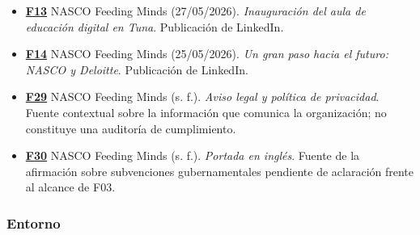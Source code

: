 \documentclass[
]{article}
\begin{document}
\begin{itemize}
  \textbf{\href{https://www.linkedin.com/posts/nasco-feeding-minds_nascofoundation-educaci\%C3\%B3ndigital-impactosocial-activity-7500847528586846208-5q6E}{F12}}
  NASCO Feeding Minds (02/09/2026). \emph{La transformación digital
  comienza con una educación básica sólida}. Publicación de LinkedIn.
\item
  \textbf{\href{https://www.linkedin.com/posts/nasco-feeding-minds_nascofoundation-feedingminds-digitaleducation-activity-7465326634426843136-PKBW}{F13}}
  NASCO Feeding Minds (27/05/2026). \emph{Inauguración del aula de
  educación digital en Tuna}. Publicación de LinkedIn.
\item
  \textbf{\href{https://www.linkedin.com/posts/nasco-feeding-minds_nasco-x-deloitte-activity-7464593630444306432-8i9r}{F14}}
  NASCO Feeding Minds (25/05/2026). \emph{Un gran paso hacia el futuro:
  NASCO y Deloitte}. Publicación de LinkedIn.
\item
  \textbf{\href{https://nascoict.org/aviso-legal-y-politica-de-privacidad/}{F29}}
  NASCO Feeding Minds (s. f.). \emph{Aviso legal y política de
  privacidad}. Fuente contextual sobre la información que comunica la
  organización; no constituye una auditoría de cumplimiento.
\item
  \textbf{\href{https://nascoict.org/en/}{F30}} NASCO Feeding Minds (s.
  f.). \emph{Portada en inglés}. Fuente de la afirmación sobre
  subvenciones gubernamentales pendiente de aclaración frente al alcance
  de F03.
\end{itemize}

\hypertarget{entorno}{%
\subsubsection{Entorno}\label{entorno}}
\end{document}
